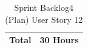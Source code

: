 \documentclass[12pt]{report}
\begin{document}
\begin{table}[h]
{\begin{tabular}{|cc|ccccccccc|}
\multicolumn{2}{|c|}{\textbf{Total}}                                                                                                                                                   & \multicolumn{9}{c|}{30   Hours}                                                                                                                                                                                                                                                                                                                                                                                                                                                                                                                                                                                                                                                                                                                                                                                                                                                                                                                                                                                                              \\ \hline
\end{tabular}
}
\caption{Sprint Backlog4 (Plan) User Story 12}
\label{tab:mytable}
\end{table}
\end{document}
